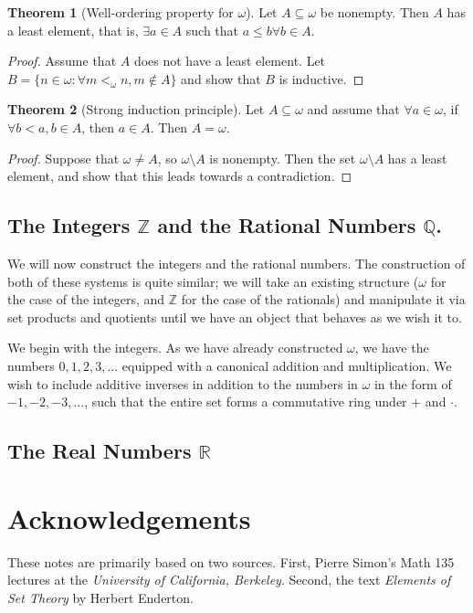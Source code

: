 \documentclass[11pt, oneside]{article}   	%
\theoremstyle{definition}
\newtheorem{theorem}{Theorem}[section]
\begin{document}
\begin{theorem}[Well-ordering property for $\omega$]
	Let $A\subseteq\omega$ be nonempty. Then $A$ has a least element, that is, $\exists a\in A$ such that $a\leq b\forall 
	b\in A$. 
\end{theorem}
\begin{proof}
	Assume that $A$ does not have a least element. Let $B = \{n\in\omega : \forall m <_\omega n, m\notin A\}$ and show 
	that $B$ is inductive. 
\end{proof}

\begin{theorem}[Strong induction principle]
	Let $A\subseteq\omega$ and assume that $\forall a\in \omega$, if $\forall b < a, b\in A$, then $a\in A$. Then $A = 
	\omega$.
\end{theorem}
\begin{proof}
	Suppose that $\omega\neq A$, so $\omega\setminus A$ is nonempty. Then the set $\omega\setminus A$ has a least 
	element, and show that this leads towards a contradiction.
\end{proof}

\newpage
\subsection{The Integers $\mathbb Z$ and the Rational Numbers $\mathbb Q$.}

We will now construct the integers and the rational numbers. The construction of both of these systems is quite similar; we 
will take an existing structure ($\omega$ for the case of the integers, and $\mathbb Z$ for the case of the rationals) and 
manipulate it via set products and quotients until we have an object that behaves as we wish it to. 

We begin with the integers. As we have already constructed $\omega$, we have the numbers $0, 1, 2, 3, ...$ equipped with a 
canonical addition and multiplication. We wish to include additive inverses in addition to the numbers in $\omega$ in the 
form of $-1, -2, -3, ...$, such that the entire set forms a commutative ring under $+$ and $\cdot$. 

\subsection{The Real Numbers $\mathbb R$}

\section{Acknowledgements}

These notes are primarily based on two sources. First, Pierre Simon's Math 135 lectures at the \textit{University of 
California, Berkeley}. Second, the text \textit{Elements of Set Theory} by Herbert Enderton.
\end{document}
